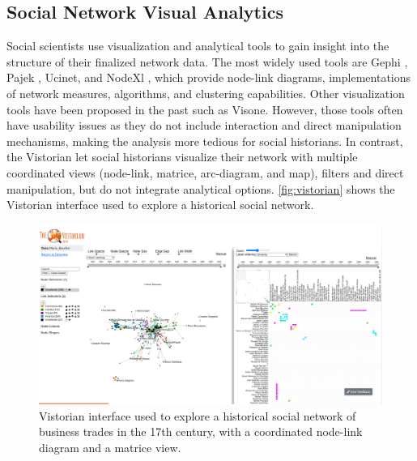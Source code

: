 \subsection{Social Network Visual Analytics}\label{subsec:social-network-visual-analytics}

Social scientists use visualization and analytical tools to gain insight into the structure of their finalized network data.
The most widely used tools are Gephi \cite{Gephi}, Pajek \cite{pajek}, Ucinet\cite{ucinet}, and NodeXl \cite{NodeXL}, which provide node-link diagrams, implementations of network measures, algorithms, and clustering capabilities.
Other \sna visualization tools have been proposed in the past such as Visone\cite{baurVisoneSoftwareVisual2002}.
However, those tools often have usability issues as they do not include interaction and direct manipulation mechanisms, making the analysis more tedious for social historians.
In contrast, the Vistorian\cite{serranomolineroUnderstandingUseVistorian2017} let social historians visualize their network with multiple coordinated views (node-link, matrice, arc-diagram, and map), filters and direct manipulation, but do not integrate analytical options.
\autoref{fig:vistorian} shows the Vistorian interface used to explore a historical social network.
\begin{figure}[!ht]
    \centering %
    \includegraphics[width=1\textwidth,trim={0 1cm 0 0},clip]{static/figures/RelatedWork/vistorian}
    \caption{Vistorian interface\cite{serranomolineroUnderstandingUseVistorian2017} used to explore a historical social network of business trades in the 17th century, with a coordinated node-link diagram and a matrice view.}
    \label{fig:vistorian}
\end{figure}
